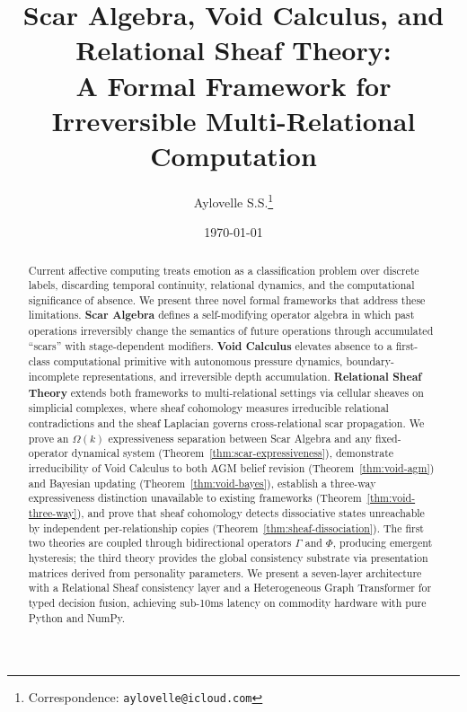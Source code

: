 \documentclass[11pt]{article}
\title{Scar Algebra, Void Calculus, and Relational Sheaf Theory:\\A Formal Framework for Irreversible Multi-Relational Computation}
\author{
  Aylovelle S.S.\thanks{Correspondence: \texttt{aylovelle@icloud.com}}
}
\date{\today}
\begin{document}
\maketitle

\begin{abstract}
Current affective computing treats emotion as a classification problem over discrete labels, discarding temporal continuity, relational dynamics, and the computational significance of absence. We present three novel formal frameworks that address these limitations. \textbf{Scar Algebra} defines a self-modifying operator algebra in which past operations irreversibly change the semantics of future operations through accumulated ``scars'' with stage-dependent modifiers. \textbf{Void Calculus} elevates absence to a first-class computational primitive with autonomous pressure dynamics, boundary-incomplete representations, and irreversible depth accumulation. \textbf{Relational Sheaf Theory} extends both frameworks to multi-relational settings via cellular sheaves on simplicial complexes, where sheaf cohomology measures irreducible relational contradictions and the sheaf Laplacian governs cross-relational scar propagation. We prove an $\Omega(k)$ expressiveness separation between Scar Algebra and any fixed-operator dynamical system (Theorem~\ref{thm:scar-expressiveness}), demonstrate irreducibility of Void Calculus to both AGM belief revision (Theorem~\ref{thm:void-agm}) and Bayesian updating (Theorem~\ref{thm:void-bayes}), establish a three-way expressiveness distinction unavailable to existing frameworks (Theorem~\ref{thm:void-three-way}), and prove that sheaf cohomology detects dissociative states unreachable by independent per-relationship copies (Theorem~\ref{thm:sheaf-dissociation}). The first two theories are coupled through bidirectional operators $\Gamma$ and $\Phi$, producing emergent hysteresis; the third theory provides the global consistency substrate via presentation matrices derived from personality parameters. We present a seven-layer architecture with a Relational Sheaf consistency layer and a Heterogeneous Graph Transformer for typed decision fusion, achieving sub-10ms latency on commodity hardware with pure Python and NumPy.
\end{abstract}

\end{document}
